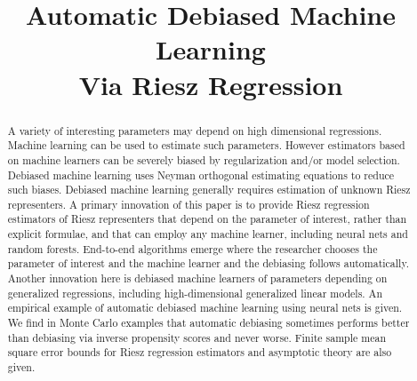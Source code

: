 \documentclass[aos]{imsart}
\numberwithin{equation}{section}
\theoremstyle{plain}
\theoremstyle{remark}
\begin{document}
\begin{frontmatter}
\title{Automatic Debiased Machine Learning \\ Via Riesz Regression}


\begin{abstract}
A variety of interesting parameters may depend on high dimensional regressions. 
Machine learning can be used to estimate such parameters. 
However estimators based on machine learners can be severely biased by regularization and/or model selection. 
Debiased machine learning uses Neyman orthogonal estimating equations to reduce such biases. 
Debiased machine learning generally requires estimation of unknown Riesz representers. 
A primary innovation of this paper is to provide Riesz regression estimators of Riesz representers that depend on the parameter of interest, rather than explicit formulae, and that can employ any machine learner, including neural nets and random forests.
End-to-end algorithms emerge where the researcher chooses the parameter of interest and the machine learner and the debiasing follows automatically.
Another innovation here is debiased machine learners of parameters depending on generalized regressions, including high-dimensional generalized linear models.
An empirical example of automatic debiased machine learning using neural nets is given. 
We find in Monte Carlo examples that  automatic debiasing sometimes performs better than debiasing via inverse propensity scores and never worse.
Finite sample mean square error bounds for Riesz regression estimators and asymptotic theory are also given. 
\end{abstract}


\end{frontmatter}
\end{document}

